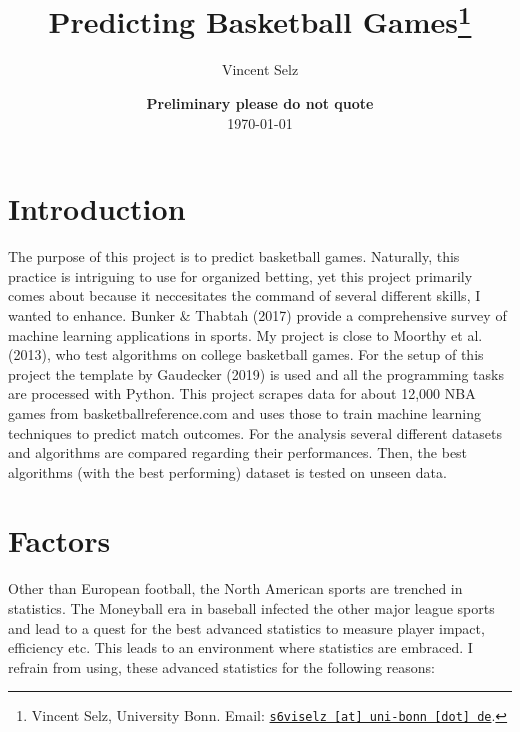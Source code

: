 \documentclass[11pt,a4paper,leqno]{article}
\begin{document}
\title{Predicting Basketball Games\thanks{Vincent Selz, University Bonn. Email: \href{mailto:s6viselz@uni-bonn.de}{\nolinkurl{s6viselz [at] uni-bonn [dot] de}}.}}

\author{Vincent Selz}

\date{
{\bf Preliminary \-\- please do not quote}
\\[1ex]
\today
}

\maketitle


\clearpage
\section{Introduction}

The purpose of this project is to predict basketball games. Naturally, this practice is intriguing to use for organized betting, yet this project primarily comes about because it neccesitates the command of several different skills, I wanted to enhance. Bunker \& Thabtah (2017) provide a comprehensive survey of machine learning applications in sports. My project is close to Moorthy et al. (2013), who test algorithms on college basketball games. For the setup of this project the template by Gaudecker (2019) is used and all the programming tasks are processed with Python. This project scrapes data for about 12,000 NBA games from basketball\-reference.com and uses those to train machine learning techniques to predict match outcomes. For the analysis several different datasets and algorithms are compared regarding their performances. Then, the best algorithms (with the best performing) dataset is tested on unseen data.


\section{Factors}


Other than European football, the North American sports are trenched in statistics. The Moneyball era in baseball infected the other major league sports and lead to a quest for the best advanced statistics to measure player impact, efficiency etc. This leads to an environment where statistics are embraced. I refrain from using, these advanced statistics for the following reasons:
\end{document}
